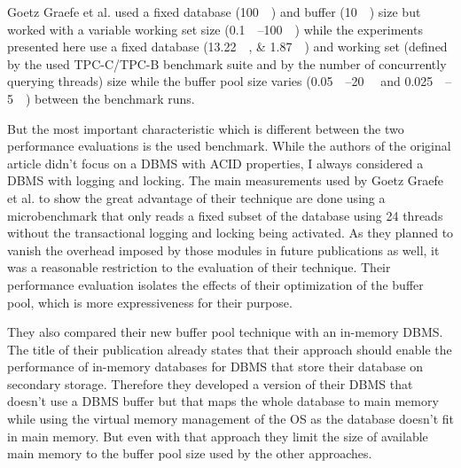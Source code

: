     Goetz Graefe et al. used a fixed database (\SI{100}{\giga\byte}) and buffer (\SI{10}{\giga\byte}) size but worked with a variable working set size (\SIrange{0.1}{100}{\giga\byte}) while the experiments presented here use a fixed database (\SIlist{13.22;1.87}{\gibi\byte}) and working set (defined by the used TPC-C/TPC-B benchmark suite and by the number of concurrently querying threads) size while the buffer pool size varies (\SIrange{0.05}{20}{\gibi\byte} and \SIrange{0.025}{5}{\gibi\byte}) between the benchmark runs.

    But the most important characteristic which is different between the two performance evaluations is the used benchmark. While the authors of the original article didn't focus on a DBMS with ACID properties, I always considered a DBMS with logging and locking. The main measurements used by Goetz Graefe et al. to show the great advantage of their technique are done using a microbenchmark that only reads a fixed subset of the database using 24 threads without the transactional logging and locking being activated. As they planned to vanish the overhead imposed by those modules in future publications as well, it was a reasonable restriction to the evaluation of their technique. Their performance evaluation isolates the effects of their optimization of the buffer pool, which is more expressiveness for their purpose.

    They also compared their new buffer pool technique with an in-memory DBMS. The title of their publication already states that their approach should enable the performance of in-memory databases for DBMS that store their database on secondary storage. Therefore they developed a version of their DBMS that doesn't use a DBMS buffer but that maps the whole database to main memory while using the virtual memory management of the OS as the database doesn't fit in main memory. But even with that approach they limit the size of available main memory to the buffer pool size used by the other approaches.

